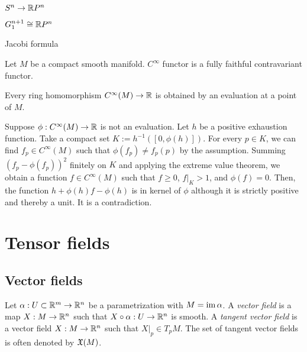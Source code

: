 \documentclass{../note}
\def\a{\alpha}
\begin{document}
\begin{prb}
$S^n\to\mathbb{R} P^n$
\end{prb}
\begin{prb}
$G_1^{n+1}\cong\mathbb{R} P^n$
\end{prb}
\begin{prb}
\end{prb}
\begin{prb}
Jacobi formula
\end{prb}
\begin{prb}
Let $M$ be a compact smooth manifold.
$C^\infty$ functor is a fully faithful contravariant functor.
\begin{parts}
\item Every ring homomorphism $C^\infty(M)\to\mathbb{R}$ is obtained by an evaluation at a point of $M$.
\end{parts}
\end{prb}
\begin{pf}
Suppose $\phi:C^\infty(M)\to\mathbb{R}$ is not an evaluation.
Let $h$ be a positive exhaustion function.
Take a compact set $K:=h^{-1}([0,\phi(h)])$.
For every $p\in K$, we can find $f_p\in C^\infty(M)$ such that $\phi(f_p)\ne f_p(p)$ by the assumption.
Summing $(f_p-\phi(f_p))^2$ finitely on $K$ and applying the extreme value theorem, we obtain a function $f\in C^\infty(M)$ such that $f\ge0$, $f|_K>1$, and $\phi(f)=0$.
Then, the function $h+\phi(h)f-\phi(h)$ is in kernel of $\phi$ although it is strictly positive and thereby a unit.
It is a contradiction.
\end{pf}









\chapter{Tensor fields}

\section{Vector fields}

\begin{prb}
Let $\a:U\subset\R^m\to\R^n$ be a parametrization with $M=\im\a$.
A \emph{vector field} is a map $X:M\to\mathbb{R}^n$ such that $X\circ\a:U\to\R^n$ is smooth.
A \emph{tangent vector field} is a vector field $X:M\to\mathbb{R}^n$ such that $X|_p\in T_pM$.
The set of tangent vector fields is often denoted by $\mathfrak{X}(M)$.
\end{prb}
\end{document}

